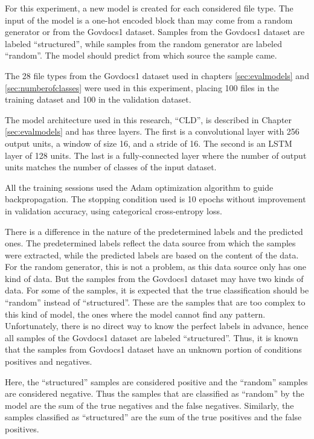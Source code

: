 
For this experiment, a new model is created for each considered file type. The input of the model is a one-hot encoded block than may come from a random generator or from the Govdocs1 dataset. Samples from the Govdocs1 dataset are labeled ``structured'', while samples from the random generator are labeled ``random''. The model should predict from which source the sample came.

The 28 file types from the Govdocs1 dataset \cite{garfinkel_bringing_2009} used in chapters \ref{sec:evalmodels} and \ref{sec:numberofclasses} were used in this experiment, placing 100 files in the training dataset and 100 in the validation dataset.


The model architecture used in this research, ``CLD'', is described in Chapter \ref{sec:evalmodels} and has three layers. The first is a convolutional layer with 256 output units, a window of size 16, and a stride of 16. The second is an LSTM layer of 128 units. The last is a fully-connected layer where the number of output units matches the number of classes of the input dataset.

All the training sessions used the Adam \cite{kingma_adam:_2014}
optimization algorithm to guide backpropagation.
The stopping condition used is 10 epochs without improvement in validation accuracy, using categorical cross-entropy loss.


There is a difference in the nature of the predetermined labels and the predicted ones. The predetermined labels reflect the data source from which the samples were extracted, while the predicted labels are based on the content of the data. For the random generator, this is not a problem, as this data source only has one kind of data. But the samples from the Govdocs1 dataset may have two kinds of data. For some of the samples, it is expected that the true classification should be ``random'' instead of ``structured''. These are the samples that are too complex to this kind of model, the ones where the model cannot find any pattern. Unfortunately, there is no direct way to know the perfect labels in advance, hence all samples of the Govdocs1 dataset are labeled ``structured''. Thus, it is known that the samples from Govdocs1 dataset have an unknown portion of conditions positives and negatives.

Here, the ``structured'' samples are considered positive and the ``random'' samples are considered negative. Thus the samples that are classified as ``random'' by the model are the sum of the true negatives and the false negatives. Similarly, the samples classified as ``structured'' are the sum of the true positives and the false positives.

